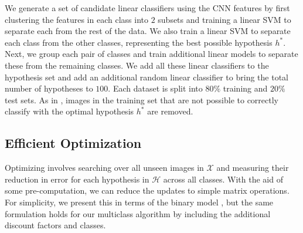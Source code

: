 \documentclass[../main.tex]{subfiles}
\begin{document}
We generate a set of candidate linear classifiers using the CNN features by first clustering the features in each class into $2$ subsets and training a linear SVM to separate each from the rest of the data.
We also train a linear SVM to separate each class from the other classes, representing the best possible hypothesis $h^*$. 
Next, we group each pair of classes and train additional linear models to separate these from the remaining classes.
We add all these linear classifiers to the hypothesis set and add an additional random linear classifier to bring the total number of hypotheses to $100$.
Each dataset is split into $80\%$ training and $20\%$ test sets.
As in \cite{singla2014near}, images in the training set that are not possible to correctly classify with the optimal hypothesis $h^*$ are removed. 



%
%
%
\subsection{Efficient Optimization}
Optimizing  involves searching over all unseen images in $\mathcal{X}$ and measuring their reduction in error for each hypothesis in $\mathcal{H}$ across all classes. 
With the aid of some pre-computation, we can reduce the updates to simple matrix operations.
For simplicity, we present this in terms of the binary \STRICT model \cite{singla2014near}, but the same formulation holds for our multiclass \EXPLAIN algorithm by including the additional discount factors and classes.
\end{document}
